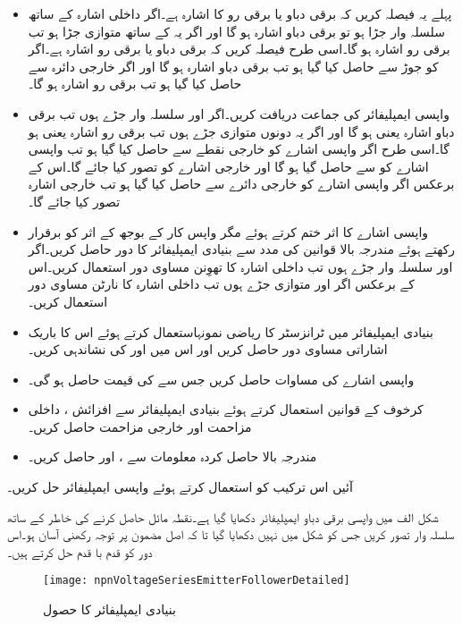 \begin{itemize}
\item
پہلے یہ فیصلہ کریں کہ  برقی دباو یا برقی رو کا اشارہ ہے۔اگر  داخلی اشارہ  کے ساتھ سلسلہ وار جڑا ہو تو  برقی دباو اشارہ ہو گا اور اگر یہ  کے ساتھ متوازی جڑا ہو تب  برقی رو اشارہ ہو گا۔اسی طرح فیصلہ کریں کہ  برقی دباو یا برقی رو اشارہ ہے۔اگر  کو  جوڑ سے حاصل کیا گیا ہو تب  برقی دباو اشارہ ہو گا اور اگر  خارجی دائرہ سے حاصل کیا گیا ہو تب  برقی رو اشارہ ہو گا۔
\item
واپسی ایمپلیفائر کی جماعت دریافت کریں۔اگر  اور  سلسلہ وار جڑے ہوں تب  برقی دباو اشارہ یعنی  ہو گا اور اگر یہ دونوں متوازی جڑے ہوں تب  برقی رو اشارہ یعنی  ہو گا۔اسی طرح اگر واپسی اشارے کو خارجی نقطے  سے حاصل کیا گیا ہو تب واپسی اشارے کو  سے حاصل گیا ہو گا اور خارجی اشارے کو  تصور کیا جائے گا۔اس کے برعکس اگر واپسی اشارے کو خارجی دائرے سے حاصل کیا گیا ہو تب خارجی اشارہ  تصور کیا جائے گا۔
\item 
واپسی اشارے کا اثر ختم کرتے ہوئے مگر واپس کار کے بوجھ کے اثر کو برقرار رکھتے ہوئے مندرجہ بالا قوانین کی مدد سے بنیادی ایمپلیفائر کا دور حاصل کریں۔اگر  اور  سلسلہ وار جڑے ہوں تب داخلی اشارہ  کا تھوِنن  مساوی دور استعمال کریں۔اس کے برعکس اگر  اور  متوازی جڑے ہوں تب داخلی اشارہ  کا نارٹن مساوی دور استعمال کریں۔
\item
بنیادی ایمپلیفائر میں ٹرانزسٹر کا ریاضی نمونہاستعمال کرتے ہوئے اس کا باریک اشاراتی مساوی دور حاصل کریں اور اس میں  اور  کی نشاندہی کریں۔
\item
واپسی اشارے  کی مساوات حاصل کریں جس سے  کی قیمت حاصل ہو گی۔
\item
کرخوف کے قوانین استعمال کرتے ہوئے بنیادی ایمپلیفائر سے افزائش ، داخلی مزاحمت  اور خارجی مزاحمت  حاصل کریں۔
\item
مندرجہ بالا حاصل کردہ معلومات سے ،  اور  حاصل کریں۔
\end{itemize}

آئیں اس ترکیب کو استعمال کرتے ہوئے واپسی ایمپلیفائر حل کریں۔

شکل  الف میں واپسی برقی دباو ایمپلیفائر دکھایا گیا ہے۔نقطہ مائل حاصل کرنے کی خاطر  کے ساتھ  سلسلہ وار تصور کریں جس کو شکل میں نہیں دکھایا گیا تا کہ اصل مضمون پر توجہ رکھنی آسان ہو۔اس دور کو قدم با قدم حل کرتے ہیں۔
\begin{figure}
\centering
\texttt{[image: npnVoltageSeriesEmitterFollowerDetailed]}
\caption{بنیادی ایمپلیفائر کا حصول}
\label{شکل_واپسی_بنیادی_ایمپلیفائر_کا_حصول}
\end{figure}

